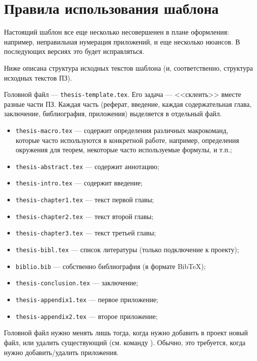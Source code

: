 ﻿\chapter{Правила использования шаблона}\label{app-manual}

Настоящий шаблон все еще несколько несовершенен в плане оформления: например, неправильная нумерация приложений, и еще несколько нюансов. В последующих версиях это будет исправляться.

Ниже описана структура исходных текстов шаблона (и, соответственно, структура исходных текстов ПЗ).

Головной файл --- \texttt{thesis-template.tex}. Его задача --- <<склеить>> вместе разные части ПЗ. Каждая часть (реферат, введение, каждая содержательная глава, заключение, библиография, приложения) выделяется в отдельный файл. 

\begin{itemize}
	\item[] \texttt{thesis-macro.tex} --- содержит определения различных макрокоманд, которые часто используются в конкретной работе, например, определения окружения для теорем, некоторые часто используемые формулы, и т.п.;
	\item[] \texttt{thesis-abstract.tex} --- содержит аннотацию;
	\item[] \texttt{thesis-intro.tex} --- содержит введение;
	\item[] \texttt{thesis-chapter1.tex} --- текст первой главы;
	\item[] \texttt{thesis-chapter2.tex} --- текст второй главы;
	\item[] \texttt{thesis-chapter3.tex} --- текст третьей главы;
	\item[] \texttt{thesis-bibl.tex} --- список литературы (только подключение к
	проекту);
	\item[] \texttt{biblio.bib} --- собственно библиография (в формате BibTeX);
	\item[] \texttt{thesis-conclusion.tex} --- заключение;
	\item[] \texttt{thesis-appendix1.tex} --- первое приложение;
	\item[] \texttt{thesis-appendix2.tex} --- второе приложение;
\end{itemize}



Головной файл нужно менять лишь тогда, когда нужно добавить в проект новый файл, или удалить существующий (см. команду \verb||). Обычно, это требуется, когда нужно добавить/удалить приложения.

